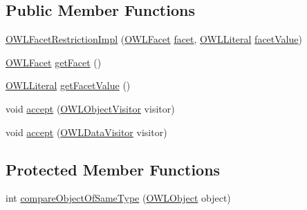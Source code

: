 \subsection*{Public Member Functions}
\begin{DoxyCompactItemize}
\item 
\hyperlink{classuk_1_1ac_1_1manchester_1_1cs_1_1owl_1_1owlapi_1_1_o_w_l_facet_restriction_impl_aa938609415617f01a28d800655952550}{O\-W\-L\-Facet\-Restriction\-Impl} (\hyperlink{enumorg_1_1semanticweb_1_1owlapi_1_1vocab_1_1_o_w_l_facet}{O\-W\-L\-Facet} \hyperlink{classuk_1_1ac_1_1manchester_1_1cs_1_1owl_1_1owlapi_1_1_o_w_l_facet_restriction_impl_a43b4dbe8b964fd6287e66fcb121da81c}{facet}, \hyperlink{interfaceorg_1_1semanticweb_1_1owlapi_1_1model_1_1_o_w_l_literal}{O\-W\-L\-Literal} \hyperlink{classuk_1_1ac_1_1manchester_1_1cs_1_1owl_1_1owlapi_1_1_o_w_l_facet_restriction_impl_afebbfcf54a2932258f5860a01ca5fa3b}{facet\-Value})
\item 
\hyperlink{enumorg_1_1semanticweb_1_1owlapi_1_1vocab_1_1_o_w_l_facet}{O\-W\-L\-Facet} \hyperlink{classuk_1_1ac_1_1manchester_1_1cs_1_1owl_1_1owlapi_1_1_o_w_l_facet_restriction_impl_a05d895431c96f45777aa545139465b58}{get\-Facet} ()
\item 
\hyperlink{interfaceorg_1_1semanticweb_1_1owlapi_1_1model_1_1_o_w_l_literal}{O\-W\-L\-Literal} \hyperlink{classuk_1_1ac_1_1manchester_1_1cs_1_1owl_1_1owlapi_1_1_o_w_l_facet_restriction_impl_a699efeccb268a93a073aa71808dd28fe}{get\-Facet\-Value} ()
\item 
void \hyperlink{classuk_1_1ac_1_1manchester_1_1cs_1_1owl_1_1owlapi_1_1_o_w_l_facet_restriction_impl_af52e4ecf3b61036aacb5f463e8268157}{accept} (\hyperlink{interfaceorg_1_1semanticweb_1_1owlapi_1_1model_1_1_o_w_l_object_visitor}{O\-W\-L\-Object\-Visitor} visitor)
\item 
void \hyperlink{classuk_1_1ac_1_1manchester_1_1cs_1_1owl_1_1owlapi_1_1_o_w_l_facet_restriction_impl_a48c3bfebdce99f44c8040b83d3df9da0}{accept} (\hyperlink{interfaceorg_1_1semanticweb_1_1owlapi_1_1model_1_1_o_w_l_data_visitor}{O\-W\-L\-Data\-Visitor} visitor)
\end{DoxyCompactItemize}
\subsection*{Protected Member Functions}
\begin{DoxyCompactItemize}
\item 
int \hyperlink{classuk_1_1ac_1_1manchester_1_1cs_1_1owl_1_1owlapi_1_1_o_w_l_facet_restriction_impl_a79e3d7d6c134febdf1c7a3b4f5a1de5a}{compare\-Object\-Of\-Same\-Type} (\hyperlink{interfaceorg_1_1semanticweb_1_1owlapi_1_1model_1_1_o_w_l_object}{O\-W\-L\-Object} object)
\end{DoxyCompactItemize}
